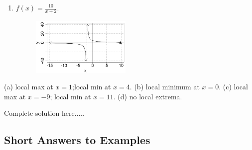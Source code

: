 \begin{example}
\begin{enumerate}[leftmargin=*]
\begin{figure}[h!]
        \label{fig:exampleGraph4}
    \end{figure}
    \item $f(x)=\displaystyle\frac{10}{x+2}$. %
    \begin{figure}[h!]
        \includegraphics[width=0.45\textwidth,inner]{images/optimization/exampleGraph5.png}
        \label{fig:exampleGraph5}
    \end{figure}
\end{enumerate}
    \begin{sol}
    (a) local max at $x=1$;local min at $x=4$. (b) local minimum at $x=0$. (c) local max at $x=-9$; local min at $x=11$. (d) no local extrema.
    \end{sol}
    \begin{solL}
    Complete solution here.....
    
    \end{solL}
    
\end{example}





\subsection*{Short Answers to Examples}





